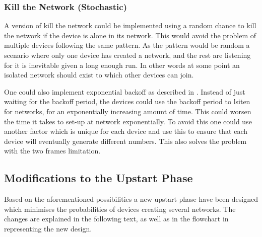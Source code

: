 \subsubsection{Kill the Network (Stochastic)}\label{KtNR}
A version of kill the network could be implemented using a random chance to kill the network if the device is alone in its network.
This would avoid the problem of multiple devices following the same pattern.
As the pattern would be random a scenario where only one device has created a network, and the rest are listening for it is inevitable given a long enough run.
In other words at some point an isolated network should exist to which other devices can join.

One could also implement exponential backoff as described in .
Instead of just waiting for the backoff period, the devices could use the backoff period to lsiten for networks, for an exponentially increasing amount of time. 
This could worsen the time it takes to set-up at network exponentially.
To avoid this one could use another factor which is unique for each device and use this to ensure that each device will eventually generate different numbers.
This also solves the problem with the two frames limitation.

\subsection{Modifications to the Upstart Phase}                 
Based on the aforementioned possibilities a new upstart phase have been designed which minimises the probabilities of devices creating several networks.
The changes are explained in the following text, as well as in the flowchart in  representing the new design.


